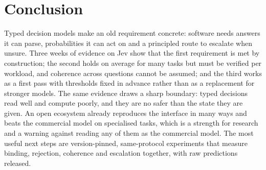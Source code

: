 \section{Conclusion}\label{sec:conclusion}

Typed decision models make an old requirement concrete: software needs answers it can parse, probabilities it can act on and a principled route to escalate when unsure. Three weeks of evidence on Jev show that the first requirement is met by construction; the second holds on average for many tasks but must be verified per workload, and coherence across questions cannot be assumed; and the third works as a first pass with thresholds fixed in advance rather than as a replacement for stronger models. The same evidence draws a sharp boundary: typed decisions read well and compute poorly, and they are no safer than the state they are given. An open ecosystem already reproduces the interface in many ways and beats the commercial model on specialised tasks, which is a strength for research and a warning against reading any of them as the commercial model. The most useful next steps are version-pinned, same-protocol experiments that measure binding, rejection, coherence and escalation together, with raw predictions released.
